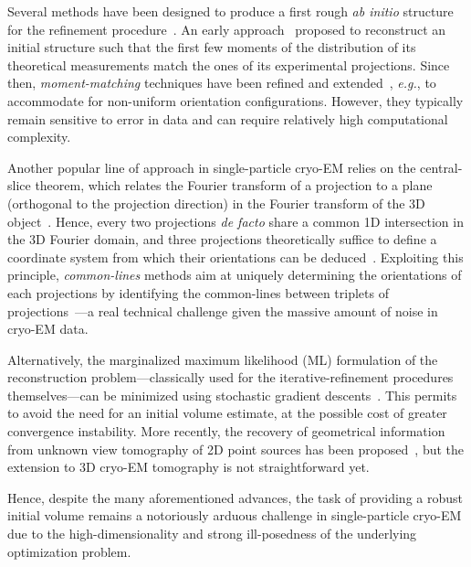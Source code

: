 Several methods have been designed to produce a first rough \textit{ab initio} structure for the refinement procedure~\cite{singer2020computational}. An early approach~\cite{kam1980reconstruction} proposed to reconstruct an initial structure such that the first few moments of the distribution of its theoretical measurements match the ones of its experimental projections. Since then, \textit{moment-matching} techniques have been refined and extended~\cite{salzman1990method,goncharov1988integral,sharon2019method}, \textit{e.g.}, to accommodate for non-uniform orientation configurations. However, they typically remain sensitive to error in data and can require relatively high computational complexity.  %

Another popular line of approach in single-particle cryo-EM  relies on the central-slice theorem, which relates the Fourier transform of a projection to a plane (orthogonal to the projection direction) in the Fourier transform of the 3D object~\cite{Natterer2001mathematics}. Hence, every two projections \textit{de facto} share a common 1D intersection in the 3D Fourier domain, and three projections theoretically suffice to define a coordinate system from which their orientations can be deduced~\cite{van1987angular}. Exploiting this principle, \textit{common-lines} methods aim at uniquely determining the orientations of each projections by identifying the common-lines between triplets of projections~\cite{penczek1994ribosome,mallick2006structure,singer2010detecting,wang2013orientation,greenberg2017common,pragier2019common}---a real technical challenge given the massive amount of noise in cryo-EM data. %

Alternatively, the  marginalized maximum likelihood (ML) formulation of the reconstruction problem---classically used for the iterative-refinement procedures themselves---can be minimized using stochastic gradient descents~\cite{punjani2017cryosparc}. This permits to avoid the need for an initial volume estimate, at the possible cost of greater convergence instability. More recently, the recovery of geometrical information from unknown view tomography of 2D point sources has been proposed~\cite{zehni2019distance}, but the extension to 3D cryo-EM tomography is not straightforward yet.

Hence, despite the many aforementioned advances, the task of providing a robust initial volume remains a notoriously arduous challenge in single-particle cryo-EM due to the high-dimensionality and strong ill-posedness of the underlying optimization problem.

